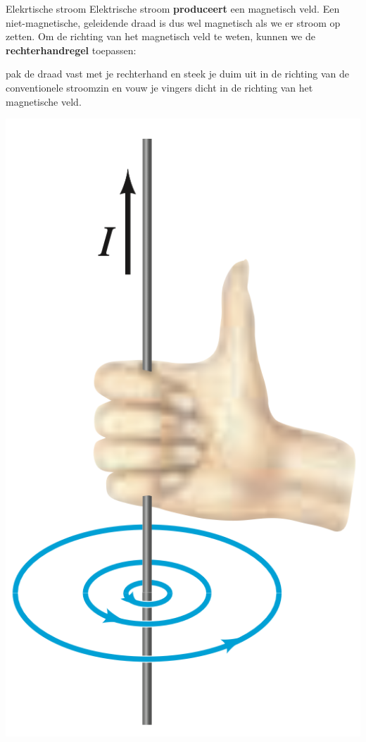 \begin{app}{Elekrtische stroom}
    Elektrische stroom \textbf{produceert} een magnetisch veld. Een niet-magnetische, geleidende draad is dus wel magnetisch als we er stroom op zetten.
    Om de richting van het magnetisch veld te weten, kunnen we de \textbf{rechterhandregel} toepassen:

    \begin{minipage}{.8\textwidth}
        pak de draad vast met je rechterhand en steek je duim uit in
        de richting van de conventionele stroomzin en vouw je vingers dicht in de richting van het magnetische veld.
    \end{minipage}
    \begin{minipage}{.16\textwidth}
        \includegraphics[scale = 0.2]{Images/Magnetisme/Rechterhandregel}
    \end{minipage}

\end{app}
